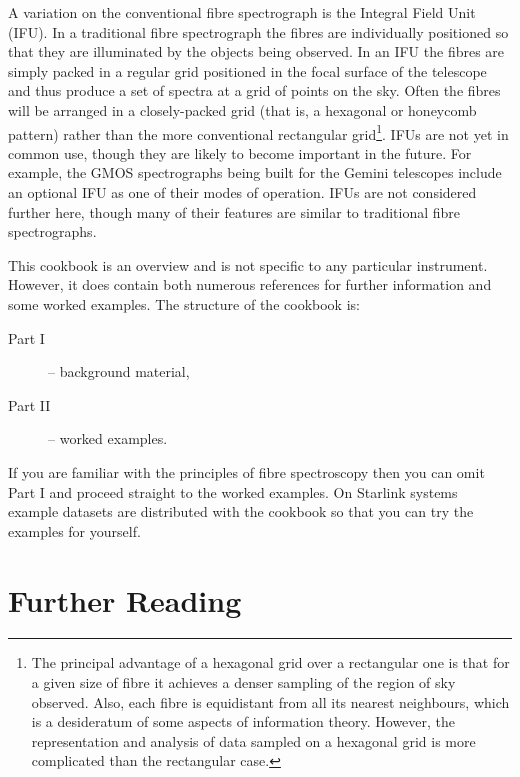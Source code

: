\documentclass[twoside,11pt]{article}
\newcommand{\xlabel}[1]{}
\begin{document}
A variation on the conventional fibre spectrograph is the Integral
Field Unit (IFU).  In a traditional fibre spectrograph the fibres
are individually positioned so that they are illuminated by the
objects being observed.  In an IFU the fibres are simply packed in a
regular grid positioned in the focal surface of the telescope and thus
produce a set of spectra at a grid of points on the sky.  Often the
fibres will be arranged in a closely-packed grid (that is, a hexagonal
or honeycomb pattern) rather than the more conventional rectangular
grid\footnote{The principal advantage of a hexagonal grid over a
rectangular one is that for a given size of fibre it achieves a
denser sampling of the region of sky observed.  Also, each fibre is
equidistant from all its nearest neighbours, which is a desideratum of
some aspects of information theory.  However, the representation and
analysis of data sampled on a hexagonal grid is more complicated than
the rectangular case.}.  IFUs are not yet in common use, though they
are likely to become important in the future.  For example, the
GMOS spectrographs\cite{ALLINGTON97} being built for the Gemini
telescopes include an optional IFU as one of their modes of operation.
IFUs are not considered further here, though many of their features
are similar to traditional fibre spectrographs.

This cookbook is an overview and is not specific to any particular
instrument.  However, it does contain both numerous references for
further information and some worked examples.  The structure of the
cookbook is:

\begin{description}

  \item[{\rm Part I}] -- background material,

  \item[{\rm Part II}] -- worked examples.

\end{description}

If you are familiar with the principles of fibre spectroscopy then
you can omit Part I and proceed straight to the worked examples.  On
Starlink systems example datasets are distributed with the cookbook
so that you can try the examples for yourself.


\section{\xlabel{FURTHER}\label{FURTHER}Further Reading}
\end{document}
